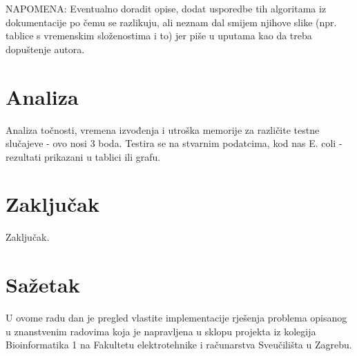 \documentclass[times, utf8, seminar, numeric]{fer}
\begin{document}
NAPOMENA: Eventualno doradit opise, dodat usporedbe tih algoritama iz dokumentacije po čemu se razlikuju, ali neznam dal smijem njihove slike (npr. tablice s vremenskim složenostima i to) jer piše u uputama kao da treba dopuštenje autora. 

 
\chapter{Analiza}
Analiza točnosti, vremena izvođenja i utroška memorije za različite testne slučajeve - ovo nosi 3 boda. Testira se na stvarnim podatcima, kod nas E. coli - rezultati prikazani u tablici ili grafu.

\chapter{Zaključak}
Zaključak.




\chapter{Sažetak}
U ovome radu dan je pregled vlastite implementacije rješenja problema opisanog u znanstvenim radovima koja je napravljena u sklopu projekta iz kolegija Bioinformatika 1 na Fakultetu elektrotehnike i računarstva Sveučilišta u Zagrebu.
\end{document}
